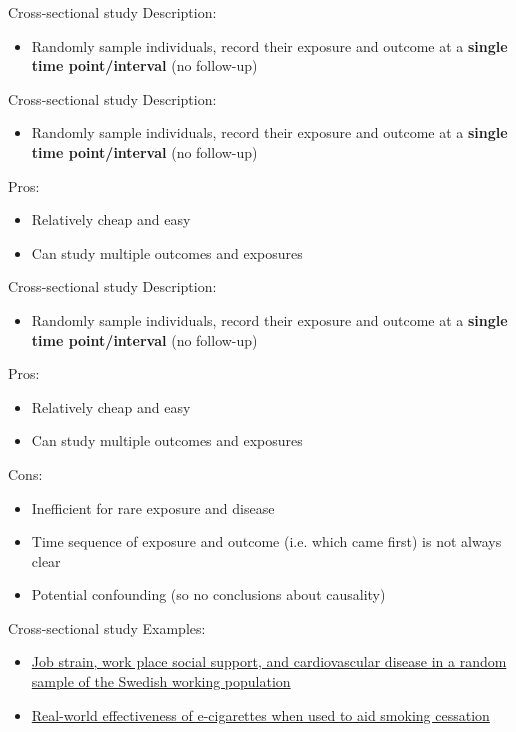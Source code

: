 \documentclass[10pt,t]{beamer}
\begin{document}
\begin{frame}{Cross-sectional study}
Description:
\begin{itemize}
	\item Randomly sample individuals, record their exposure and outcome at a \textbf{single time point/interval} (no follow-up)
\end{itemize}
\end{frame}

\begin{frame}{Cross-sectional study}
Description:
\begin{itemize}
	\item Randomly sample individuals, record their exposure and outcome at a \textbf{single time point/interval} (no follow-up)
\end{itemize}
\medskip
Pros:
\begin{itemize}
	\item Relatively cheap and easy
	\item Can study multiple outcomes and exposures
\end{itemize}
\end{frame}

\begin{frame}{Cross-sectional study}
Description:
\begin{itemize}
	\item Randomly sample individuals, record their exposure and outcome at a \textbf{single time point/interval} (no follow-up)
\end{itemize}
\medskip
Pros:
\begin{itemize}
	\item Relatively cheap and easy
	\item Can study multiple outcomes and exposures
\end{itemize}
\medskip
Cons:
\begin{itemize}
	\item Inefficient for rare exposure and disease 
	\item Time sequence of exposure and outcome (i.e. which came first) is not always clear
	\item Potential confounding (so no conclusions about causality)
\end{itemize}
\end{frame}

\begin{frame}[c]{Cross-sectional study}
Examples:
\vspace{0.3cm}

\begin{itemize}
	\item \href{http://ajph.aphapublications.org/doi/abs/10.2105/AJPH.78.10.1336}{\color{cyan} Job strain, work place social support, and cardiovascular disease in a random sample of the Swedish working population}
	\item \href{onlinelibrary.wiley.com/doi/10.1111/add.12623/full}{\color{cyan} Real-world effectiveness of e-cigarettes when used to aid smoking cessation}
\end{itemize}



\end{frame}
\end{document}
